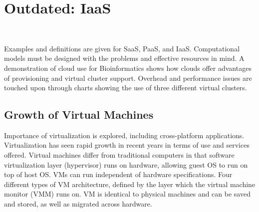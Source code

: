 \chapter{Outdated: IaaS}

\label{sec:icloud-iaas}

\FILENAME\

Examples and definitions are given for SaaS, PaaS, and IaaS.
Computational models must be designed with the problems and effective
resources in mind. A demonstration of cloud use for Bioinformatics
shows how clouds offer advantages of provisioning and virtual cluster
support. Overhead and performance issues are touched upon through
charts showing the use of three different virtual clusters.


\begin{comment}
\TODO{This video is outdated, start wom abou 1:00 to end}
\TODO{The content seems redundant, we will provide an updated lecture.}

\video{Cloud}{7:45}{Course Expectations}{https://www.youtube.com/watch?v=j3sUW376pw8}

\slides{Cloud}{Page 1}{Course Expectations}{https://drive.google.com/open?id=0B88HKpainTSfQU1uQmxZWHdWQ1k}

\slides{Cloud}{Page 1}{Course Expectations - pptx}{https://drive.google.com/open?id=0B88HKpainTSfb1ZhWG4zTEg0SVk}
\end{comment}

\section{Growth of Virtual Machines}

Importance of virtualization is explored, including cross-platform
applications. Virtualization has seen rapid growth in recent years in
terms of use and services offered. Virtual machines differ from
traditional computers in that software virtualization layer (hypervisor)
runs on hardware, allowing guest OS to run on top of host OS. VMs can
run independent of hardware specifications. Four different types of VM
architecture, defined by the layer which the virtual machine monitor
(VMM) runs on. VM is identical to physical machines and can be saved and
stored, as well as migrated across hardware.



